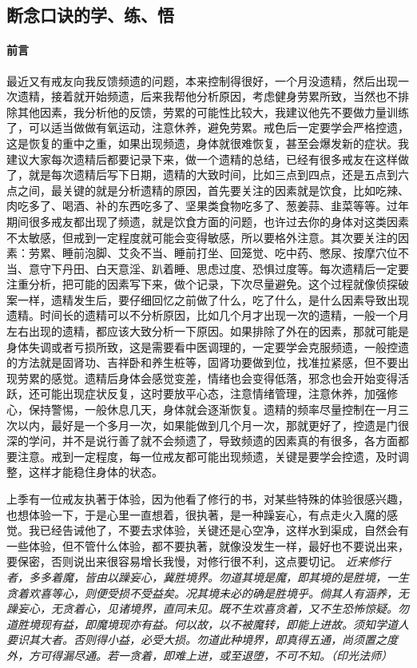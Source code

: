 \subsection{断念口诀的学、练、悟}

\paragraph*{前言}

最近又有戒友向我反馈频遗的问题，本来控制得很好，一个月没遗精，然后出现一次遗精，接着就开始频遗，后来我帮他分析原因，考虑健身劳累所致，当然也不排除其他因素，我分析他的反馈，劳累的可能性比较大，我建议他先不要做力量训练了，可以适当做做有氧运动，注意休养，避免劳累。戒色后一定要学会严格控遗，这是恢复的重中之重，如果出现频遗，身体就很难恢复，甚至会爆发新的症状。我建议大家每次遗精后都要记录下来，做一个遗精的总结，已经有很多戒友在这样做了，就是每次遗精后写下日期，遗精的大致时间，比如三点到四点，还是五点到六点之间，最关键的就是分析遗精的原因，首先要关注的因素就是饮食，比如吃辣、肉吃多了、喝酒、补的东西吃多了、坚果类食物吃多了、葱姜蒜、韭菜等等。过年期间很多戒友都出现了频遗，就是饮食方面的问题，也许过去你的身体对这类因素不太敏感，但戒到一定程度就可能会变得敏感，所以要格外注意。其次要关注的因素：劳累、睡前泡脚、艾灸不当、睡前打坐、回笼觉、吃中药、憋尿、按摩穴位不当、意守下丹田、白天意淫、趴着睡、思虑过度、恐惧过度等。每次遗精后一定要注重分析，把可能的因素写下来，做个记录，下次尽量避免。这个过程就像侦探破案一样，遗精发生后，要仔细回忆之前做了什么，吃了什么，是什么因素导致出现遗精。时间长的遗精可以不分析原因，比如几个月才出现一次的遗精，一般一个月左右出现的遗精，都应该大致分析一下原因。如果排除了外在的因素，那就可能是身体失调或者亏损所致，这是需要看中医调理的，一定要学会克服频遗，一般控遗的方法就是固肾功、吉祥卧和养生桩等，固肾功要做到位，找准拉紧感，但不要出现劳累的感觉。遗精后身体会感觉变差，情绪也会变得低落，邪念也会开始变得活跃，还可能出现症状反复，这时要放平心态，注意情绪管理，注意休养，加强修心，保持警惕，一般休息几天，身体就会逐渐恢复。遗精的频率尽量控制在一月三次以内，最好是一个多月一次，如果能做到几个月一次，那就更好了，控遗是门很深的学问，并不是说行善了就不会频遗了，导致频遗的因素真的有很多，各方面都要注意。戒到一定程度，每一位戒友都可能出现频遗，关键是要学会控遗，及时调整，这样才能稳住身体的状态。

上季有一位戒友执著于体验，因为他看了修行的书，对某些特殊的体验很感兴趣，也想体验一下，于是心里一直想着，很执著，是一种躁妄心，有点走火入魔的感觉。我已经告诫他了，不要去求体验，关键还是心空净，这样水到渠成，自然会有一些体验，但不管什么体验，都不要执著，就像没发生一样，最好也不要说出来，要保密，否则说出来很容易增长我慢，对修行很不利，这点要切记。 \textit{近来修行者，多多着魔，皆由以躁妄心，冀胜境界。勿道其境是魔，即其境的是胜境，一生贪着欢喜等心，则便受损不受益矣。况其境未必的确是胜境乎。倘其人有涵养，无躁妄心，无贪着心，见诸境界，直同未见。既不生欢喜贪着，又不生恐怖惊疑。勿道胜境现有益，即魔境现亦有益。何以故，以不被魔转，即能上进故。须知学道人要识其大者。否则得小益，必受大损。勿道此种境界，即真得五通，尚须置之度外，方可得漏尽通。若一贪着，即难上进，或至退堕，不可不知。（印光法师）}

